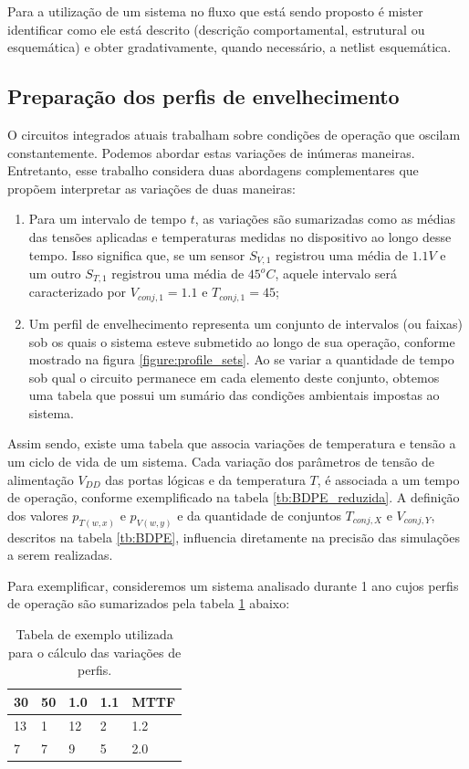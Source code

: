 Para a utilização de um sistema no fluxo que está sendo proposto é mister identificar como ele está descrito (descrição comportamental, estrutural ou esquemática) e obter gradativamente, quando necessário, a netlist esquemática.

\subsection{Preparação dos perfis de envelhecimento}
\label{subsection_perfis}
O circuitos integrados atuais trabalham sobre condições de operação que oscilam constantemente. Podemos abordar estas variações de inúmeras maneiras. Entretanto, esse trabalho considera duas abordagens complementares que propõem interpretar as variações de duas maneiras:
\begin{enumerate}
	\item Para um intervalo de tempo $t$, as variações são sumarizadas como as médias das tensões aplicadas e temperaturas medidas no dispositivo ao longo desse tempo. Isso significa que, se um sensor $S_{V,1}$ registrou uma média de $1.1V$ e um outro $S_{T,1}$ registrou uma média de $45^{o}C$, aquele intervalo será caracterizado por $V_{conj,1}=1.1$ e $T_{conj,1}=45$;
	\item Um perfil de envelhecimento representa um conjunto de intervalos (ou faixas) sob os quais o sistema esteve submetido ao longo de sua operação, conforme mostrado na figura \ref{figure:profile_sets}. Ao se variar a quantidade de tempo sob qual o circuito permanece em cada elemento deste conjunto, obtemos uma tabela que possui um sumário das condições ambientais impostas ao sistema.
\end{enumerate}
Assim sendo, existe uma tabela que associa variações de temperatura e tensão a um ciclo de vida de um sistema. Cada variação dos parâmetros de tensão de alimentação $V_{DD}$ das portas lógicas e da temperatura $T$, é associada a um tempo de operação, conforme exemplificado na tabela \ref{tb:BDPE_reduzida}. A definição dos valores $p_{T(w,x)}$ e $p_{V(w,y)}$ e da quantidade de conjuntos $T_{conj,X}$ e $V_{conj,Y}$, descritos na tabela \ref{tb:BDPE}, influencia diretamente na precisão das simulações a serem realizadas.

Para exemplificar, consideremos um sistema analisado durante 1 ano cujos perfis de operação são sumarizados pela tabela \ref{tb:regressao_multipla_exemplo2} abaixo:
\begin{table}[H]
	\centering
	\caption{Tabela de exemplo utilizada para o cálculo das variações de perfis.}
	\begin{tabular}{@{}l|l|l|l|l@{}}
		\toprule
		30 & 50 & 1.0 & 1.1 & MTTF \\ \midrule
		13 & 1 & 12 & 2 & 1.2 \\
		7 & 7 & 9 & 5 & 2.0 \\ \bottomrule
	\end{tabular}
	\label{tb:regressao_multipla_exemplo2}
\end{table}

